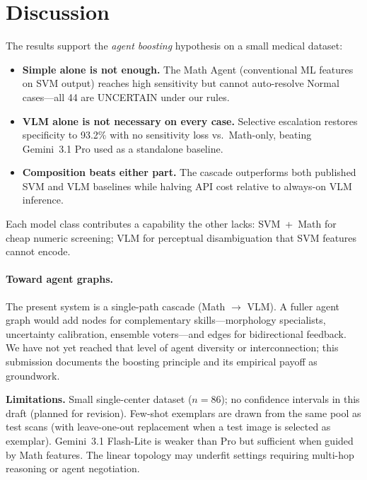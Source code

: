 \documentclass[11pt]{article}
\begin{document}
\section{Discussion}

The results support the \emph{agent boosting} hypothesis on a small medical dataset:
\begin{itemize}[nosep]
  \item \textbf{Simple alone is not enough.} The Math Agent (conventional ML features on SVM output) reaches high sensitivity but cannot auto-resolve Normal cases---all 44 are UNCERTAIN under our rules.
  \item \textbf{VLM alone is not necessary on every case.} Selective escalation restores specificity to 93.2\% with no sensitivity loss vs.\ Math-only, beating Gemini~3.1 Pro used as a standalone baseline.
  \item \textbf{Composition beats either part.} The cascade outperforms both published SVM and VLM baselines while halving API cost relative to always-on VLM inference.
\end{itemize}

Each model class contributes a capability the other lacks: SVM~+~Math for cheap numeric screening; VLM for perceptual disambiguation that SVM features cannot encode.

\paragraph{Toward agent graphs.}
The present system is a single-path cascade (Math $\rightarrow$ VLM).
A fuller agent graph would add nodes for complementary skills---morphology specialists, uncertainty calibration, ensemble voters---and edges for bidirectional feedback.
We have not yet reached that level of agent diversity or interconnection; this submission documents the boosting principle and its empirical payoff as groundwork.

\textbf{Limitations.}
Small single-center dataset ($n=86$); no confidence intervals in this draft (planned for revision).
Few-shot exemplars are drawn from the same pool as test scans (with leave-one-out replacement when a test image is selected as exemplar).
Gemini~3.1 Flash-Lite is weaker than Pro but sufficient when guided by Math features.
The linear topology may underfit settings requiring multi-hop reasoning or agent negotiation.
\end{document}
